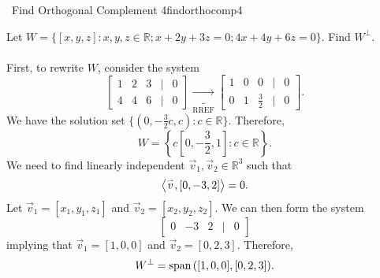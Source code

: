         \pagebreak
        \begin{example}{\Difficulty\,\Difficulty\,\,Find Orthogonal Complement 4}{findorthocomp4}

            Let \(W=\{[x,y,z]:x,y,z\in\mathbb{R};x+2y+3z=0;4x+4y+6z=0\}\). Find \(W^\perp\).
            \\
            \\
            First, to rewrite \(W\), consider the system
            \begin{equation*}
                \begin{bmatrix}
                    1 & 2 & 3 & | & 0 \\
                    4 & 4 & 6 & | & 0
                \end{bmatrix}\underbrace{\to}_\text{RREF}
                \begin{bmatrix}
                    1 & 0 & 0 & | & 0 \\
                    0 & 1 & \frac{3}{2} & | & 0
                \end{bmatrix}.
            \end{equation*}
            We have the solution set \(\{(0,-\frac{3}{2}c,c):c\in\mathbb{R}\}\). Therefore,
            \begin{equation*}
                W=\left\{c\left[0,-\frac{3}{2},1\right]:c\in\mathbb{R}\right\}.
            \end{equation*}
            We need to find linearly independent \(\vec{v}_1,\vec{v}_2\in\mathbb{R}^3\) such that
            \begin{equation*}
                \left\langle \overset{_{\rightharpoonup}}{v},[0,-3,2]\right\rangle=0.
            \end{equation*}
            Let \(\vec{v}_1=[x_1,y_1,z_1]\) and \(\vec{v}_2=[x_2,y_2,z_2]\). We can then form the system
            \begin{equation*}
                \begin{bmatrix}
                    0 & -3 & 2 & | & 0
                \end{bmatrix}
            \end{equation*}
            implying that \(\vec{v}_1=[1,0,0]\) and \(\vec{v}_2=[0,2,3]\). Therefore,
            \begin{equation*}
                W^\perp=\text{span\,}([1,0,0],[0,2,3]).
            \end{equation*}
        \end{example}
        \pagebreak
        \vphantom
        \\
        \\
